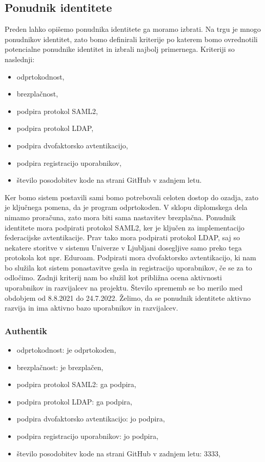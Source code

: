 \documentclass[a4paper,12pt,openright]{book}
\begin{document}
\subsection{Ponudnik identitete}
Preden lahko opišemo ponudnika identitete ga moramo izbrati. Na trgu je mnogo ponudnikov identitet, zato bomo definirali kriterije po katerem bomo ovrednotili potencialne ponudnike identitet in izbrali najbolj primernega. Kriteriji so naslednji:
\begin{itemize}
    \item odprtokodnost,
    \item brezplačnost,
    \item podpira protokol SAML2,
    \item podpira protokol LDAP,
    \item podpira dvofaktorsko avtentikacijo,
    \item podpira registracijo uporabnikov,
    \item število posodobitev kode na strani GitHub\cite{github} v zadnjem letu.
\end{itemize}

Ker bomo sistem postavili sami bomo potrebovali celoten dostop do ozadja, zato je ključnega pomena, da je program odprtokoden. V sklopu diplomskega dela nimamo proračuna, zato mora biti sama nastavitev brezplačna. Ponudnik identitete mora podpirati protokol SAML2, ker je ključen za implementacijo federacijske avtentikacije. Prav tako mora podpirati protokol LDAP, saj so nekatere storitve v sistemu Univerze v Ljubljani dosegljive samo preko tega protokola kot npr. Eduroam. Podpirati mora dvofaktorsko avtentikacijo, ki nam bo služila kot sistem ponastavitve gesla in registracijo uporabnikov, če se za to odločimo. Zadnji kriterij nam bo služil kot približna ocena aktivnosti uporabnikov in razvijalcev na projektu. Število sprememb se bo merilo med obdobjem od 8.8.2021 do 24.7.2022. Želimo, da se ponudnik identitete aktivno razvija in ima aktivno bazo uporabnikov in razvijalcev.

\subsubsection{Authentik}
\begin{itemize}
    \item odprtokodnost: je odprtokoden,
    \item brezplačnost: je brezplačen,
    \item podpira protokol SAML2: ga podpira,
    \item podpira protokol LDAP: ga podpira,
    \item podpira dvofaktorsko avtentikacijo: jo podpira,
    \item podpira registracijo uporabnikov: jo podpira,
    \item število posodobitev kode na strani GitHub v zadnjem letu: 3333\cite{AuthentikGit},
\end{itemize}
\end{document}
